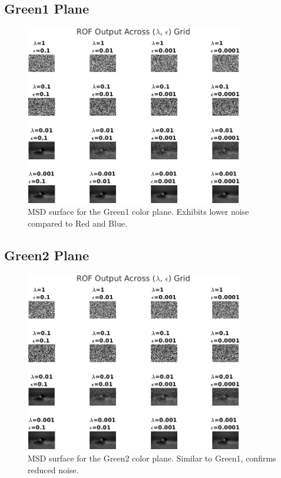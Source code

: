 \documentclass[11pt]{article}
\begin{document}
\subsection*{Green1 Plane}
\begin{figure}[h!]
\centering
\includegraphics[width=0.85\textwidth]{../test/results/rof_grid_plane_G1.png}
\caption{MSD surface for the Green1 color plane. Exhibits lower noise compared to Red and Blue.}
\end{figure}
\clearpage

\subsection*{Green2 Plane}
\begin{figure}[h!]
\centering
\includegraphics[width=0.85\textwidth]{../test/results/rof_grid_plane_G2.png}
\caption{MSD surface for the Green2 color plane. Similar to Green1, confirms reduced noise.}
\end{figure}
\clearpage
\end{document}
